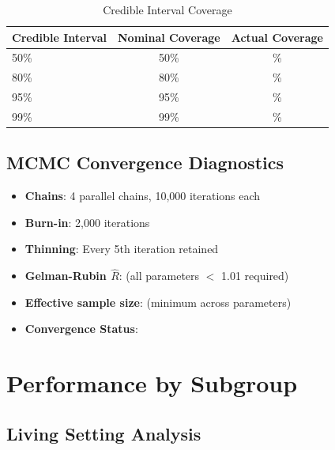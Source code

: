\begin{table}[h]
\centering
\caption{Credible Interval Coverage}
\begin{tabular}{lcc}
\toprule
\textbf{Credible Interval} & \textbf{Nominal Coverage} & \textbf{Actual Coverage} \\
\midrule
50\% & 50\% & \ModelEightCoverageFifty{}\% \\
80\% & 80\% & \ModelEightCoverageEighty{}\% \\
95\% & 95\% & \ModelEightCoverageNinetyFive{}\% \\
99\% & 99\% & \ModelEightCoverageNinetyNine{}\% \\
\bottomrule
\end{tabular}
\end{table}

\subsection{MCMC Convergence Diagnostics}

\begin{itemize}
    \item \textbf{Chains}: 4 parallel chains, 10,000 iterations each
    \item \textbf{Burn-in}: 2,000 iterations
    \item \textbf{Thinning}: Every 5th iteration retained
    \item \textbf{Gelman-Rubin $\hat{R}$}: \ModelEightMaxRhat{} (all parameters $<$ 1.01 required)
    \item \textbf{Effective sample size}: \ModelEightMinESS{} (minimum across parameters)
    \item \textbf{Convergence Status}: \ModelEightConverged{}
\end{itemize}

\section{Performance by Subgroup}

\subsection{Living Setting Analysis}

